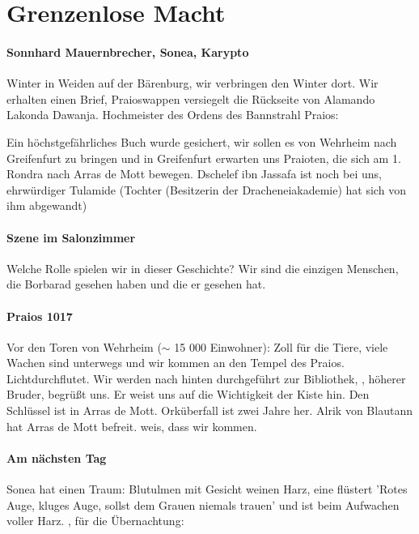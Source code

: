 \section{Grenzenlose Macht}
\label{sec:grenzenlose-macht}

\paragraph{Sonnhard Mauernbrecher, Sonea, Karypto}


Winter in Weiden auf der Bärenburg, wir verbringen den Winter dort. Wir erhalten einen Brief, Praioswappen versiegelt die Rückseite von Alamando Lakonda Dawanja. Hochmeister des Ordens des Bannstrahl Praios: 

Ein höchstgefährliches Buch wurde gesichert, wir sollen es von Wehrheim nach Greifenfurt zu bringen und in Greifenfurt erwarten uns Praioten, die sich am 1. Rondra nach Arras de Mott bewegen.
Dschelef ibn Jassafa ist noch bei uns, ehrwürdiger Tulamide (Tochter  (Besitzerin der Dracheneiakademie) hat sich von ihm abgewandt)

\paragraph{Szene im Salonzimmer}
\label{sec:szene-im-salonzimmer}

Welche Rolle spielen wir in dieser Geschichte? Wir sind die einzigen Menschen, die Borbarad gesehen haben und die er gesehen hat. 

\paragraph{Praios 1017}
\label{sec:praios-1017}
Vor den Toren von Wehrheim ($\sim$ 15 000 Einwohner):  Zoll für die Tiere, viele Wachen sind unterwegs und wir kommen an den Tempel des Praios. Lichtdurchflutet. Wir werden nach hinten durchgeführt zur Bibliothek, , höherer Bruder, begrüßt uns. Er weist uns auf die Wichtigkeit der Kiste hin. Den Schlüssel ist in Arras de Mott. Orküberfall ist zwei Jahre her. Alrik von Blautann hat Arras de Mott befreit.   weis, dass wir kommen.
\paragraph{Am nächsten Tag}
Sonea hat einen Traum: Blutulmen mit Gesicht weinen Harz, eine flüstert 'Rotes Auge, kluges Auge, sollst dem Grauen niemals trauen' und ist beim Aufwachen voller Harz. , für die Übernachtung: 


